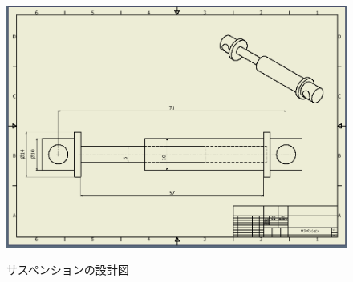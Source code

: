 \documentclass[11pt]{jsarticle}
\begin{document}
\begin{figure}[htbt]
 \begin{center}
  \includegraphics[width=120mm]{img/saspention.png}
 　\caption{サスペンションの設計図}
  \label{fig:saspention}%
 \end{center}
\end{figure}
\end{document}
